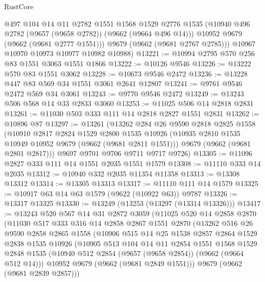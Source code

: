 \begin{lexlean}{RustCore}
\begin{coremodule}
          @497
          @104
          @14
          @11
          @2782
          @1551
          @1568
          @1529
          @2776
          @1535
          (@10940 @496 @2782 (@9657 (@9658 @2782)) (@9662 (@9664 @496 @14)))
          @10952
          @9679
          (@9662 (@9681 @2777 @1551)))
        @9679
        (@9662 (@9681 @2767 @2785)))
      @10967
      @10970
      @10973
      @10977
      @10982
      @10988)
@13221 := @10994 @2795 @570 @256 @83 @1551 @3063 @1551 @1866
@13222 := @10126 @9546
@13226 := @13222 @570 @83 @1551 @3062
@13228 := @10673 @9546 @2472
@13236 := @13228 @447 @83 @569 @34 @1551 @3061 @2641 @12807
@13241 := @9761 @9546 @2472 @569 @34 @3061
@13243 := @9770 @9546 @2472
@13249 := @13243 @506 @568 @14 @33 @2833 @3060
@13253 := @11025 @506 @14 @2818 @2831
@13261 := @11030 @503 @333 @111 @14 @2818 @2827 @1551 @2831
@13262 := @10896 @87
@13297 := @13261
    (@13262
      @284
      @26
      @9590
      @2818
      @2825
      @1558
      (@10910
        @2817
        @2824
        @1529
        @2800
        @1535
        @10926
        (@10935 @2810 @1535 @10949 @10952 @9679 (@9662 (@9681 @2811 @1551)))
        @9679
        (@9662 (@9681 @2801 @2817)))
      @9697
      @9701
      @9706
      @9711
      @9717
      @9726)
@13305 := @11096 @2827 @333 @111 @14 @1551 @2035 @1551 @1579
@13308 := @11110 @333 @14 @2035
@13312 := @10940 @332 @2035 @11354 @11358
@13313 := @13308 @13312
@13314 := @13305 @13313
@13317 := @11110 @111 @14 @1579
@13325 := @10917 @63 @14 @63 @1579 (@9622 (@10922 @63)) @9787
@13326 := @13317 @13325
@13330 := @13249 (@13253 (@13297 (@13314 @13326)))
@13417 := @13243
    @520
    @567
    @14
    @31
    @2872
    @3059
    (@11025
      @520
      @14
      @2858
      @2870
      (@11030
        @517
        @333
        @316
        @14
        @2858
        @2867
        @1551
        @2870
        (@13262
          @516
          @26
          @9590
          @2858
          @2865
          @1558
          (@10906
            @515
            @14
            @25
            @1538
            @2857
            @2864
            @1529
            @2838
            @1535
            @10926
            (@10905
              @513
              @104
              @14
              @11
              @2854
              @1551
              @1568
              @1529
              @2848
              @1535
              (@10940 @512 @2854 (@9657 (@9658 @2854)) (@9662 (@9664 @512 @14)))
              @10952
              @9679
              (@9662 (@9681 @2849 @1551)))
            @9679
            (@9662 (@9681 @2839 @2857)))

\end{coremodule}
\end{lexlean}
